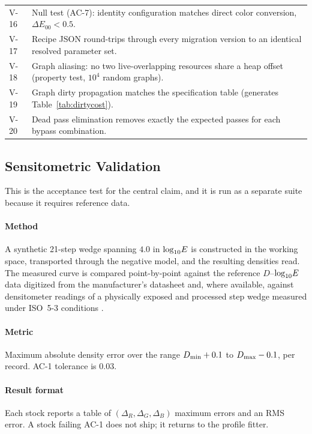 \begin{table}[htbp]
\begin{center}
\begin{tabularx}{\columnwidth}{@{}l>{\raggedright\arraybackslash}X@{}}
V-16 & Null test (AC-7): identity configuration matches direct color conversion, $\Delta E_{00} < 0.5$. \\
V-17 & Recipe JSON round-trips through every migration version to an identical resolved parameter set. \\
V-18 & Graph aliasing: no two live-overlapping resources share a heap offset (property test, $10^4$ random graphs). \\
V-19 & Graph dirty propagation matches the specification table (generates Table~\ref{tab:dirtycost}). \\
V-20 & Dead pass elimination removes exactly the expected passes for each bypass combination. \\
\bottomrule
\end{tabularx}
\end{center}
\end{table}

\subsection{Sensitometric Validation}

This is the acceptance test for the central claim, and it is run as a separate
suite because it requires reference data.

\paragraph{Method} A synthetic 21-step wedge spanning $4.0$ in $\log_{10}\!E$ is
constructed in the working space, transported through the negative model, and
the resulting densities read. The measured curve is compared point-by-point
against the reference $D$--$\log_{10}\!E$ data digitized from the manufacturer's
datasheet \cite{kodakportra,kodakektar,kodakvision3,kodaktrix,fujidata,ilfordhp5}
and, where available, against densitometer readings of a physically exposed and
processed step wedge measured under ISO~5-3 conditions \cite{iso5}.

\paragraph{Metric} Maximum absolute density error over the range $D_{\min} + 0.1$
to $D_{\max} - 0.1$, per record. AC-1 tolerance is $0.03$.

\paragraph{Result format} Each stock reports a table of $(\Delta_R, \Delta_G,
\Delta_B)$ maximum errors and an RMS error. A stock failing AC-1 does not ship;
it returns to the profile fitter.

